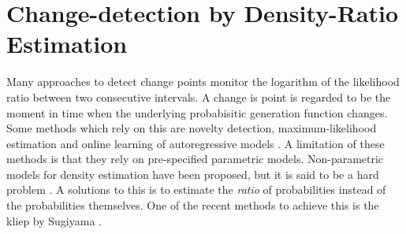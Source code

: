 \section{Change-detection by Density-Ratio Estimation}\label{sec:density-ratio}









Many approaches to detect change points monitor the logarithm of the likelihood ratio between two consecutive intervals.
A change is point is regarded to be the moment in time when the underlying probabisitic generation function changes.
Some methods which rely on this are novelty detection, maximum-likelihood estimation and online learning of autoregressive models \cite{kawahara2009change}.
A limitation of these methods is that they rely on pre-specified parametric models.
Non-parametric models for density estimation have been proposed, but it is said to be a hard problem \cite{hardle2004nonparametric, sugiyama2012density}.
A solutions to this is to estimate the \emph{ratio} of probabilities instead of the probabilities themselves.
One of the recent methods to achieve this is the \gls{kliep} by Sugiyama \etal \cite{sugiyama2008direct}.

